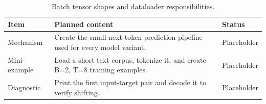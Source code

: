 \begin{table}[H]
\centering
\caption{Batch tensor shapes and dataloader responsibilities.}
\label{tab:ch02-dataset-and-token-batches}
\begin{tabularx}{\textwidth}{p{}X p{}}
\toprule
Item & Planned content & Status \\
\midrule
Mechanism & Create the small next-token prediction pipeline used for every model variant. & Placeholder \\
Mini-example & Load a short text corpus, tokenize it, and create B=2, T=8 training examples. & Placeholder \\
Diagnostic & Print the first input-target pair and decode it to verify shifting. & Placeholder \\
\bottomrule
\end{tabularx}
\end{table}
